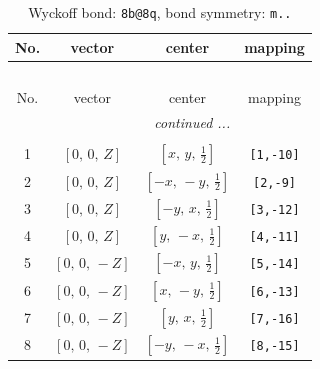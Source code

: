 \documentclass[fleqn,8pt]{jsarticle}
\begin{document}
\begin{longtable}{cccc}
\caption{Wyckoff bond: {\tt 8b@8q}, bond symmetry: {\tt m..}}
 \\
 \hline \hline
No. & vector & center & mapping \\ \hline \endfirsthead

\multicolumn{3}{l}{\tablename\ \thetable{}} \\
 \hline \hline
No. & vector & center & mapping \\ \hline \endhead

 \hline \hline
\multicolumn{3}{r}{\footnotesize\it continued ...} \\ \endfoot

 \hline \hline
\multicolumn{3}{r}{} \\ \endlastfoot

1 & $\left[ 0,\, 0,\, Z \right]$ & $\left[ x,\, y,\, \frac{1}{2} \right]$ & {\tt [1,-10]} \\ \hline
2 & $\left[ 0,\, 0,\, Z \right]$ & $\left[ - x,\, - y,\, \frac{1}{2} \right]$ & {\tt [2,-9]} \\ \hline
3 & $\left[ 0,\, 0,\, Z \right]$ & $\left[ - y,\, x,\, \frac{1}{2} \right]$ & {\tt [3,-12]} \\ \hline
4 & $\left[ 0,\, 0,\, Z \right]$ & $\left[ y,\, - x,\, \frac{1}{2} \right]$ & {\tt [4,-11]} \\ \hline
5 & $\left[ 0,\, 0,\, - Z \right]$ & $\left[ - x,\, y,\, \frac{1}{2} \right]$ & {\tt [5,-14]} \\ \hline
6 & $\left[ 0,\, 0,\, - Z \right]$ & $\left[ x,\, - y,\, \frac{1}{2} \right]$ & {\tt [6,-13]} \\ \hline
7 & $\left[ 0,\, 0,\, - Z \right]$ & $\left[ y,\, x,\, \frac{1}{2} \right]$ & {\tt [7,-16]} \\ \hline
8 & $\left[ 0,\, 0,\, - Z \right]$ & $\left[ - y,\, - x,\, \frac{1}{2} \right]$ & {\tt [8,-15]} \\
\end{longtable}
\renewcommand{\arraystretch}{1.2}
\end{document}

